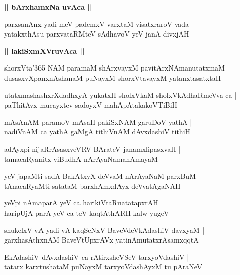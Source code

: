 \documentclass[twoside,12pt,openright]{book}
\newcounter{shloka}[chapter]
\def\uvaca#1{\centerline{{\large\textbf{#1}}}}
\begin{document}
\uvaca{|| bArxhamxNa uvAca ||}

\begin{shloka}%
parxsanAnx yadi meV pademxV varxtaM visatxraroV vada |\\
yatakxthAsu parxvataRMteV sAdhavoV yeV janA divxjAH 
\end{shloka}

\uvaca{|| lakiSxmXVruvAca ||}

\begin{shloka}%
shorxVta\char'365 NAM paramaM shArxvayxM pavitArxNAmanutatxmaM |\\
dusasxvXpanxnAshanaM puNayxM shorxVtavayxM yatanxtasatxtaH
\end{shloka}

\begin{shloka}%
utatxmashashxrXdadhxyA yukatxH sholxVkaM sholxVkAdhaRmeVva ca |\\
paThitAvx mucayxtev sadoyxV mahApAtakakoVTiBiH
\end{shloka}

\begin{shloka}%
mAsAnAM paramoV mAsaH pakiSxNAM garuDoV yathA |\\
nadiVnAM ca yathA gaMgA tithiVnAM dAvxdashiV tithiH 
\end{shloka}

\begin{shloka}%
adAyxpi nijaRrAsasxveVRV BArateV janamxlipasxvaH |\\
tamacaRyanitx viBudhA nArAyaNamanAmayaM 
\end{shloka}

\begin{shloka}%
yeV japaMti sadA BakAtxyX deVvaM nArAyaNaM parxBuM |\\
tAnacaRyaMti satataM barxhAmxdAyx deVvatAgaNAH 
\end{shloka}

\begin{shloka}%
yeVpi nAmaparA yeV ca harikiVtaRnatatapxrAH |\\
haripUjA parA yeV ca teV kaqtAthARH kalw yugeV 
\end{shloka}

\begin{shloka}%
shukelxV vA yadi vA kaqSeNxV BaveVdeVkAdashiV davxyaM |\\
garxhasAthxnAM BaveVtUpxrAVx yatinAmutatxrAsamxqqtA
\end{shloka}

\begin{shloka}%
EkAdashiV dAvxdashiV ca rAtirxsheVSeV tarxyoVdashiV |\\
tatarx karxtushataM puNayxM tarxyoVdashAyxM tu pAraNeV 
\end{shloka}
\end{document}
